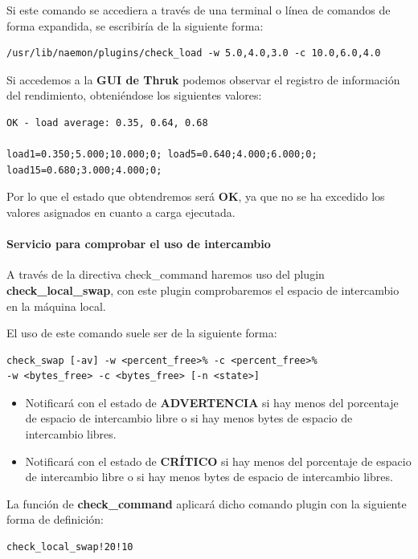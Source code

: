 Si este comando se accediera a través de una terminal o línea de comandos de forma expandida, se escribiría de la siguiente forma:

\begin{lstlisting}
/usr/lib/naemon/plugins/check_load -w 5.0,4.0,3.0 -c 10.0,6.0,4.0
\end{lstlisting}

Si accedemos a la \textbf{GUI de Thruk} podemos observar el registro de información del rendimiento, obteniéndose los siguientes valores:

\begin{lstlisting}
OK - load average: 0.35, 0.64, 0.68

load1=0.350;5.000;10.000;0; load5=0.640;4.000;6.000;0; load15=0.680;3.000;4.000;0;
\end{lstlisting}

Por lo que el estado que obtendremos será \textbf{OK}, ya que no se ha excedido los valores asignados en cuanto a carga ejecutada.
\paragraph{Servicio para comprobar el uso de intercambio}

A través de la directiva check\_command haremos uso del plugin \textbf{check\_local\_swap}, con este plugin comprobaremos el espacio de intercambio en la máquina local.

El uso de este comando suele ser de la siguiente forma:
\begin{lstlisting}
check_swap [-av] -w <percent_free>% -c <percent_free>%
-w <bytes_free> -c <bytes_free> [-n <state>]
\end{lstlisting}

\begin{itemize}
	\item Notificará con el estado de \textbf{ADVERTENCIA} si hay menos del porcentaje de espacio de intercambio libre o si hay menos bytes de espacio de intercambio libres.
	\item Notificará con el estado de \textbf{CRÍTICO}  si hay menos del porcentaje de espacio de intercambio libre o si hay menos bytes de espacio de intercambio libres.
\end{itemize}


La función de \textbf{check\_command} aplicará dicho comando plugin con la siguiente forma de definición:
\begin{lstlisting}	
check_local_swap!20!10

\end{lstlisting} 

